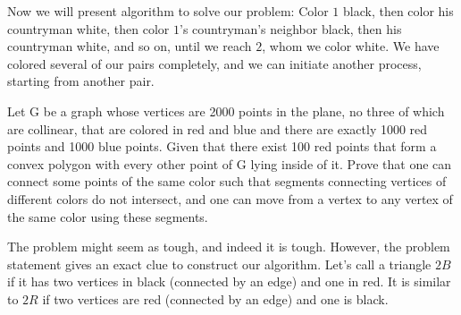 Now we will present algorithm to solve our problem:
Color $1$ black, then color his countryman white, then color $1$'s countryman's neighbor black, then his countryman white, and so on, until we reach $2$, whom we color white. We have colored several of our pairs completely, and we can initiate another process, starting from another pair.

\begin{example} [Kazakhstan 2023]
    Let G be a graph whose vertices are 2000 points in the plane, no three of which are collinear, that are colored in red and blue and there are exactly 1000 red points and 1000 blue points. Given that there exist 100 red points that form a convex polygon with every other point of G lying inside of it. Prove that one can connect some points of the same color such that segments connecting vertices of different colors do not intersect, and one can move from a vertex to any vertex of the same color using these segments.
\end{example}
\sol
The problem might seem as tough, and indeed it is tough. However, the problem statement gives an exact clue to construct our algorithm.
Let's call a triangle $2B$ if it has two vertices in black (connected by an edge) and one in red. It is similar to $2R$ if two vertices are red (connected by an edge) and one is black.

